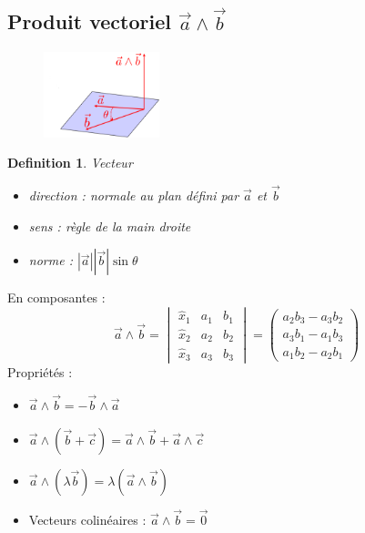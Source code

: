 \documentclass{article}
\newtheorem{definition}{Definition}[section]
\begin{document}
\subsection{Produit vectoriel \(\overrightarrow{a} \wedge \overrightarrow{b}\)}
\begin{figure}
    \centering
    \includegraphics[width = 0.30\textwidth]{Images/Plan.png}
    \label{fig:plan}
\end{figure}
\begin{definition}
    Vecteur
    \begin{itemize}
        \item direction : normale au plan défini par \( \overrightarrow{a} \) et \( \overrightarrow{b} \) 
        \item sens : règle de la main droite
        \item norme : \( |\overrightarrow{a}||\overrightarrow{b}|\sin{\theta} \)
    \end{itemize}
\end{definition}
En composantes :
\[ \overrightarrow{a} \wedge \overrightarrow{b} = \begin{vmatrix}
    \hat{x}_1 & a_1 & b_1 \\
    \hat{x}_2 & a_2 & b_2 \\
    \hat{x}_3 & a_3 & b_3
\end{vmatrix} = \begin{pmatrix}
    a_2b_3 - a_3b_2 \\
    a_3b_1 - a_1b_3 \\
    a_1b_2 - a_2b_1
\end{pmatrix}\]
Propriétés :
\begin{itemize}
    \item \( \overrightarrow{a} \wedge \overrightarrow{b} = -\overrightarrow{b} \wedge \overrightarrow{a} \)
    \item \( \overrightarrow{a} \wedge (\overrightarrow{b} + \overrightarrow{c}) = \overrightarrow{a} \wedge \overrightarrow{b} + \overrightarrow{a} \wedge \overrightarrow{c} \)
    \item \( \overrightarrow{a} \wedge (\lambda \overrightarrow{b}) = \lambda (\overrightarrow{a} \wedge \overrightarrow{b}) \)
    \item Vecteurs colinéaires : \( \overrightarrow{a} \wedge \overrightarrow{b} = \overrightarrow{0} \)
\end{itemize}
\end{document}
